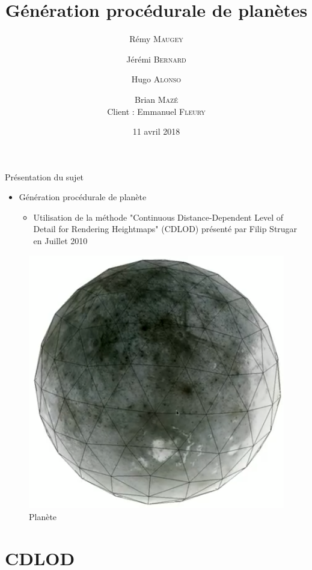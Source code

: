 \documentclass[french]{beamer}
\title{Génération procédurale de planètes}
\author{  \vspace{1.5cm}Rémy \textsc{Maugey} \and
  Jérémi \textsc{Bernard} \and
  Hugo \textsc{Alonso} \and
  Brian \textsc{Mazé}\\
  \vspace{2.5cm}
  Client : Emmanuel \textsc{Fleury}}
\date{11 avril 2018}
\begin{document}
\begin{frame}
  \titlepage
\end{frame}

\begin{frame}{Présentation du sujet}

  
    \begin{itemize}
  \item
    Génération procédurale de planète
    \begin{itemize}
    \item
      Utilisation de la méthode \alert{"Continuous Distance-Dependent Level of Detail for Rendering Heightmaps"} (CDLOD) présenté par Filip Strugar en Juillet 2010\protect\footnotemark
    \end{itemize}
  \end{itemize}
  
  \begin{figure}
   \includegraphics[scale=0.20]{img/planet_intro.png}
   \caption{Planète}
\end{figure}
  
    
\end{frame}

\section{CDLOD}
\end{document}
